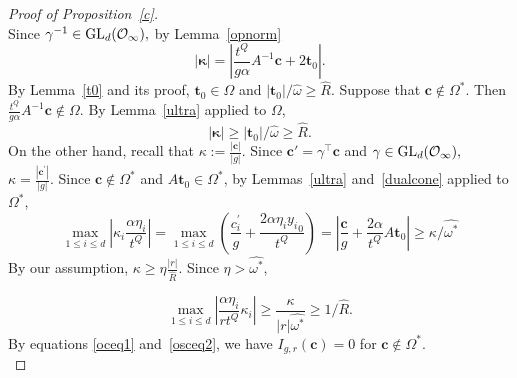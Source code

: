 \documentclass[10pt]{amsart}
\theoremstyle{plain}
\theoremstyle{plain}
\renewcommand{\vec}[1]{\mathbf{#1}}
\theoremstyle{remark}
\theoremstyle{definition}
\renewcommand{\hat}{\widehat}
\newcommand{\hR}{\widehat{R}}
\newcommand{\GL}{\textup{GL}}
\newcommand{\cO}{\mathcal{O}}
\begin{document}
\begin{proof}[Proof of Proposition~\ref{c}]
\[\]
Since $\gamma^{-1} \in \GL_d(\cO_{\infty}),$ by Lemma~\ref{opnorm} 
\[
|\boldsymbol{\kappa}|=  \left|  \frac{t^Q}{g\alpha}A^{-1} \vec{c}+2\vec{t}_0\right|.
\]
By Lemma~\ref{t0} and its proof, $\vec{t}_0\in \Omega$ and $|\vec{t}_0|/\hat{\omega} \geq \hR$.  Suppose that $\vec{c}\notin\Omega^*.$ Then  $ \frac{t^Q}{g\alpha}A^{-1} \vec{c} \notin \Omega.$  By Lemma~\ref{ultra} applied to $\Omega$, 
\[
 |\boldsymbol{\kappa}| \geq |\vec{t}_0|/\hat{\omega} \geq \hR.
\]
 On the other hand, recall that  $\kappa:=\frac{|\vec{c}|}{|g|}.$  Since $\vec{c}'=\gamma^{\intercal } \vec{c}$ and $\gamma\in \GL_d(\cO_{\infty}),$ $\kappa=\frac{|\vec{c}^{\prime}|}{|g| }.$   Since $\vec{c}\notin\Omega^*$ and $A\vec{t}_0\in\Omega^*$, by Lemmas~\ref{ultra} and~\ref{dualcone} applied to $\Omega^*$, 
\[
\max_{1\leq i\leq d} \left|\kappa_i \frac{\alpha \eta_i }{t^{Q}} \right| =\max_{1\leq i\leq d}  \left(\frac{c_i^{\prime} }{g}+\frac{2\alpha \eta_i {y_i}_{0}}{t^Q} \right) = \left| \frac{\vec{c}}{g}+ \frac{2\alpha}{t^Q}A\vec{t}_0\right|
\geq  \kappa/\hat{\omega^*}    
\]
 By our assumption,   $\kappa \geq \eta  \frac{|r|}{\hR}. $ Since $\eta>\hat{\omega^*},$  
 
\[ \max_{1\leq i\leq d} |\frac{\alpha \eta_i }{rt^{Q}} \kappa_i | \geq \frac{\kappa}{|r|\hat{\omega^*} }\geq     1/\hR .\]
By equations \eqref{oceq1} and~\eqref{osceq2}, we have    $I_{g,r}(\vec{c})=0$ for   $\vec{c}\notin\Omega^*.$
 \\
 

\end{proof}
\end{document}
